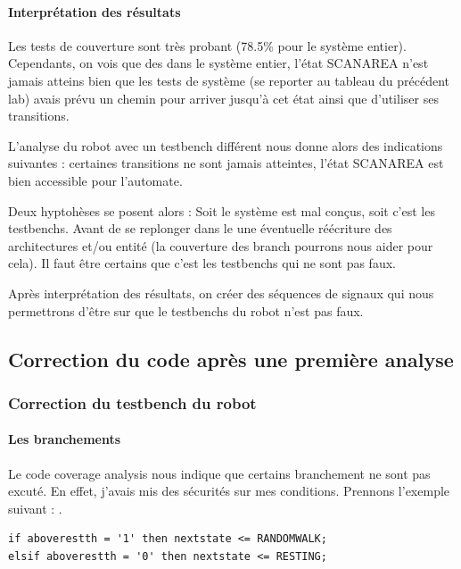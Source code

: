\documentclass{article}
\newcommand{\sautligne}{
\textbf{\vspace{5mm}}
}
\begin{document}
\paragraph{Interprétation des résultats}
Les tests de couverture sont très probant (78.5\% pour le système entier). Cependants, on vois que des dans le système entier, l'état SCANAREA n'est jamais atteins bien que les tests de système (se reporter au tableau du précédent lab) avais prévu un chemin pour arriver jusqu'à cet état ainsi que d'utiliser ses transitions. 

L'analyse du robot avec un testbench différent nous donne alors des indications suivantes : certaines transitions ne sont jamais atteintes, l'état SCANAREA est bien accessible pour l'automate. 
\sautligne

Deux hyptohèses se posent alors : Soit le système est mal conçus, soit c'est les testbenchs. Avant de se replonger dans le une éventuelle réécriture des architectures et/ou entité (la couverture des branch pourrons nous aider pour cela). Il faut être certains que c'est les testbenchs qui ne sont pas faux.

Après interprétation des résultats, on créer des séquences de signaux qui nous permettrons d'être sur que le testbenchs du robot n'est pas faux.



\subsection{Correction du code après une première analyse }

\subsubsection{Correction du testbench du robot}

\paragraph{Les branchements}

Le code coverage analysis nous indique que certains branchement ne sont pas excuté. En effet, j'avais mis des sécurités sur mes conditions. Prennons l'exemple suivant : .

\begin{verbatim}
if aboverestth = '1' then nextstate <= RANDOMWALK;
elsif aboverestth = '0' then nextstate <= RESTING;
\end{verbatim} 
\end{document}
